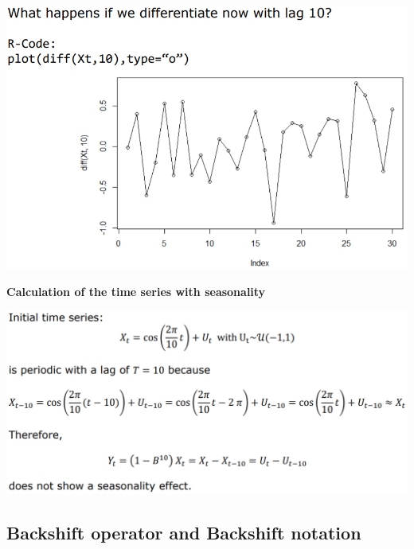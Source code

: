 \documentclass[
]{article}
\begin{document}
\includegraphics[width=1\linewidth]{cos_diff}

\textbf{Calculation of the time series with seasonality}

\includegraphics[width=1\linewidth]{calc_cos}

\hypertarget{backshift-operator-and-backshift-notation}{%
\subsection{Backshift operator and Backshift
notation}\label{backshift-operator-and-backshift-notation}}
\end{document}
